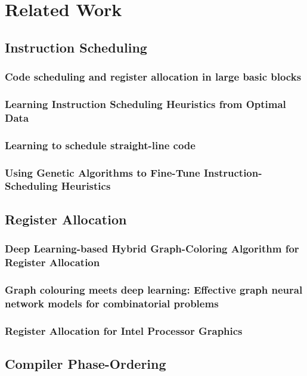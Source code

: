 \chapter{Related Work}
\section{Instruction Scheduling}
\subsection*{Code scheduling and register allocation in large basic blocks}\cite{goodman1988code}
\subsection*{Learning Instruction Scheduling Heuristics from Optimal Data}\cite{russell2006learning}
\subsection*{Learning to schedule straight-line code}\cite{moss1998learning}
\subsection*{Using Genetic Algorithms to Fine-Tune Instruction-Scheduling Heuristics}\cite{beaty1996using}

\section{Register Allocation}
\subsection*{Deep Learning-based Hybrid Graph-Coloring Algorithm for Register Allocation}\cite{das2019deep}
\subsection*{Graph colouring meets deep learning: Effective graph neural network models for combinatorial problems}\cite{lemos2019graph}
\subsection*{Register Allocation for Intel Processor Graphics}\cite{chen2018register}

\section{Compiler Phase-Ordering}


